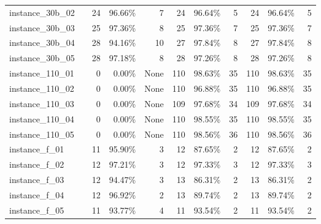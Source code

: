 \documentclass[12pt,a4paper,openright,twoside]{book}
\begin{document}
\begin{table}[H]
{\begin{tabular}{|ll|rrr|rrr|rrr|}
 instance\_30b\_02             &     &  24  &    96.66\%  &   7       &   24  &     96.64\%  &   5     &   24  &     96.64\%  &   5  \\              
 instance\_30b\_03             &     &  25  &    97.36\%  &   8       &   25  &     97.36\%  &   7     &   25  &     97.36\%  &   7  \\              
 instance\_30b\_04             &     &  28  &    94.16\%  &   10      &   27  &     97.84\%  &   8     &   27  &     97.84\%  &   8  \\                 
 instance\_30b\_05             &     &  28  &    97.18\%  &   8       &   28  &     97.26\%  &   8     &   28  &     97.26\%  &   8  \\              
 instance\_110\_01            &     &  0  &      0.00\%  &   None        &   110  &   98.63\%  &   35     &   110  &   98.63\%  &   35  \\             
 instance\_110\_02            &     &  0  &      0.00\%  &   None        &   110  &   96.88\%  &   35     &   110  &   96.88\%  &   35  \\             
 instance\_110\_03            &     &  0  &      0.00\%  &   None     &   109  &   97.68\%  &   34     &   109  &   97.68\%  &   34  \\                
 instance\_110\_04            &     &  0  &      0.00\%  &   None    &   110  &   98.55\%  &   35     &   110  &   98.55\%  &   35  \\                
 instance\_110\_05            &     &  0  &      0.00\%  &   None    &   110  &   98.56\%  &   36     &   110  &   98.56\%  &   36  \\                
 instance\_f\_01              &     &  11  &    95.90\%  &   3       &   12  &     87.65\%  &   2     &   12  &     87.65\%  &   2  \\              
 instance\_f\_02              &     &  12  &    97.21\%  &   3       &   12  &     97.33\%  &   3     &   12  &     97.33\%  &   3  \\              
 instance\_f\_03              &     &  12  &    94.47\%  &   3       &   13  &     86.31\%  &   2     &   13  &     86.31\%  &   2  \\              
 instance\_f\_04              &     &  12  &    96.92\%  &   2       &   13  &     89.74\%  &   2     &   13  &     89.74\%  &   2  \\              
 instance\_f\_05              &     &  11  &    93.77\%  &   4       &   11  &     93.54\%  &   2     &   11  &     93.54\%  &   2  \\              
  \hline
\end{tabular}
}
\end{table}
\end{document}
